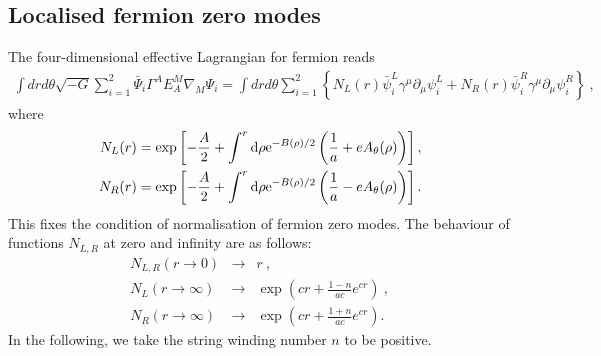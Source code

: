 \documentclass[a4paper,12pt]{article}
\begin{document}
\subsection{Localised fermion zero modes}
The four-dimensional effective Lagrangian for fermion reads 
\begin{eqnarray}
\nonumber
\int dr d\theta \sqrt{-G}
\sum_{i=1}^2\bar\Psi_i\Gamma^AE_A^M  \nabla_M\Psi_i=
\int dr d\theta 
\sum_{i=1}^2\left\{N_L(r)\bar\psi_i^L\gamma^\mu\partial_\mu\psi_i^L+
N_R(r) \bar\psi_i^R\gamma^\mu\partial_\mu\psi_i^R
\right\}~,
\label{efflagr}
\end{eqnarray}
where
\begin{eqnarray}
N_L(r)=\exp\left[-\frac{A}{2}+ \int^r{\rm d}\rho{\rm e}^{-B(\rho)/2}
\left({1\over a}+e
A_\theta(\rho)\right)\right],
\label{normg}
\\
\nonumber
N_R(r)=\exp\left[-\frac{A}{2}+ \int^r{\rm d}\rho{\rm e}^{-B(\rho)/2}
\left({1\over a}-e
A_\theta(\rho)\right)\right].
\end{eqnarray}
This fixes the condition of normalisation of fermion zero modes. The
behaviour of functions $N_{L,R}$ at zero and infinity are as follows:
\begin{eqnarray}
\nonumber
N_{L,R}(r \to 0) &\to& r~,\\
N_L(r \to \infty) &\to& \exp\left(cr+\frac{1-n}{ac}e^{cr}\right)~,
\label{norm}
\\
\nonumber
N_R(r \to \infty) &\to& \exp\left(cr+\frac{1+n}{ac}e^{cr}\right).
\end{eqnarray}
In the following, we take the string winding number $n$ to be positive.
\end{document}
